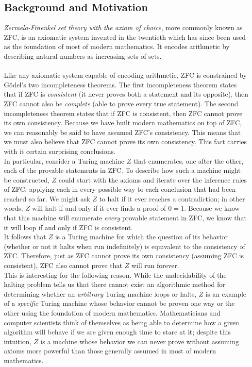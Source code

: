 \documentclass[11pt]{article}
\begin{document}
\subsection{Background and Motivation \label{sec:background}}

\emph{Zermelo-Fraenkel set theory with the axiom of choice}, more commonly known as ZFC, is an axiomatic system invented in the twentieth which has since been used as the foundation of most of modern mathematics. It encodes arithmetic by describing natural numbers as increasing sets of sets. \\
\\
Like any axiomatic system capable of encoding arithmetic, ZFC is constrained by G\"{o}del's two incompleteness theorems. The first incompleteness theorem states that if ZFC is \emph{consistent} (it never proves both a statement and its opposite), then ZFC cannot also be \emph{complete} (able to prove every true statement). The second incompleteness theorem states that if ZFC is consistent, then ZFC cannot prove its own consistency. Because we have built modern mathematics on top of ZFC, we can reasonably be said to have assumed ZFC's consistency. This means that we must also believe that ZFC cannot prove its own consistency. This fact carries with it certain surprising conclusions. \\

In particular, consider a Turing machine $Z$ that enumerates, one after the other, each of the provable statements in ZFC. To describe how such a machine might be constructed, $Z$ could start with the axioms and iterate over the inference rules of ZFC, applying each in every possible way to each conclusion that had been reached so far. We might ask $Z$ to halt if it ever reaches a contradiction; in other words, $Z$ will halt if and only if it ever finds a proof of $0 = 1$. Because we know that this machine will enumerate \emph{every} provable statement in ZFC, we know that it will loop if and only if ZFC is consistent. \\

It follows that $Z$ is a Turing machine for which the question of its behavior (whether or not it halts when run indefinitely) is equivalent to the consistency of ZFC. Therefore, just as ZFC cannot prove its own consistency (assuming ZFC is consistent), ZFC also cannot prove that $Z$ will run forever. \\

This is interesting for the following reason. While the undecidability of the halting problem tells us that there cannot exist an algorithmic method for determining whether an \emph{arbitrary} Turing machine loops or halts, $Z$ is an example of a \emph{specific} Turing machine whose behavior cannot be proven one way or the other using the foundation of modern mathematics. Mathematicians and computer scientists think of themselves as being able to determine how a given algorithm will behave if we are given enough time to stare at it; despite this intuition, $Z$ is a machine whose behavior we can never prove without assuming axioms more powerful than those generally assumed in most of modern mathematics. \\
\end{document}
